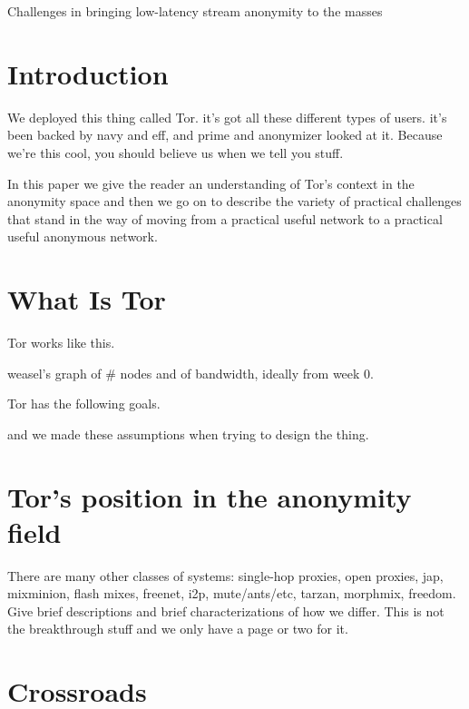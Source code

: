 


Challenges in bringing low-latency stream anonymity to the masses


\section{Introduction}

We deployed this thing called Tor. it's got all these different types of
users. it's been backed by navy and eff, and prime and anonymizer looked at
it. Because we're this cool, you should believe us when we tell you stuff.

In this paper we give the reader an understanding of Tor's context
in the anonymity space and then we go on to describe the variety of
practical challenges that stand in the way of moving from a practical
useful network to a practical useful anonymous network.


\section{What Is Tor}

Tor works like this.

weasel's graph of # nodes and of bandwidth, ideally from week 0.

Tor has the following goals.

and we made these assumptions when trying to design the thing.

\section{Tor's position in the anonymity field}

There are many other classes of systems: single-hop proxies, open proxies,
jap, mixminion, flash mixes, freenet, i2p, mute/ants/etc, tarzan,
morphmix, freedom. Give brief descriptions and brief characterizations
of how we differ. This is not the breakthrough stuff and we only have
a page or two for it.


\section{Crossroads}

